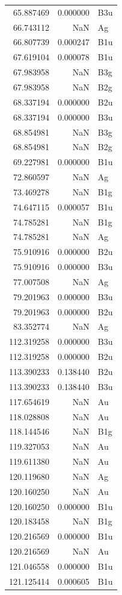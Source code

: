 \begin{longtable}{rrl}
65.887469 & 0.000000 & B3u \\
66.743112 & NaN & Ag \\
66.807739 & 0.000247 & B1u \\
67.619104 & 0.000078 & B1u \\
67.983958 & NaN & B3g \\
67.983958 & NaN & B2g \\
68.337194 & 0.000000 & B2u \\
68.337194 & 0.000000 & B3u \\
68.854981 & NaN & B3g \\
68.854981 & NaN & B2g \\
69.227981 & 0.000000 & B1u \\
72.860597 & NaN & Ag \\
73.469278 & NaN & B1g \\
74.647115 & 0.000057 & B1u \\
74.785281 & NaN & B1g \\
74.785281 & NaN & Ag \\
75.910916 & 0.000000 & B2u \\
75.910916 & 0.000000 & B3u \\
77.007508 & NaN & Ag \\
79.201963 & 0.000000 & B3u \\
79.201963 & 0.000000 & B2u \\
83.352774 & NaN & Ag \\
112.319258 & 0.000000 & B3u \\
112.319258 & 0.000000 & B2u \\
113.390233 & 0.138440 & B2u \\
113.390233 & 0.138440 & B3u \\
117.654619 & NaN & Au \\
118.028808 & NaN & Au \\
118.144546 & NaN & B1g \\
119.327053 & NaN & Au \\
119.611380 & NaN & Au \\
120.119680 & NaN & Ag \\
120.160250 & NaN & Au \\
120.160250 & 0.000000 & B1u \\
120.183458 & NaN & B1g \\
120.216569 & 0.000000 & B1u \\
120.216569 & NaN & Au \\
121.046558 & 0.000000 & B1u \\
121.125414 & 0.000605 & B1u \\

\end{longtable}
